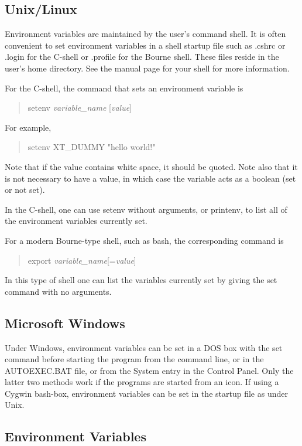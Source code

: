 \begin{itemize}
\subsection{Unix/Linux}

Environment variables are maintained by the user's command shell.  It
is often convenient to set environment variables in a shell startup
file such as {\vt .cshrc} or {\vt .login} for the C-shell or {\vt
.profile} for the Bourne shell.  These files reside in the user's home
directory.  See the manual page for your shell for more information.

For the C-shell, the command that sets an environment variable is
\begin{quote}
{\vt setenv} {\it variable\_name} [{\it value\/}]
\end{quote}
For example,
\begin{quote}
{\vt setenv XT\_DUMMY "hello world!"}
\end{quote}
Note that if the value contains white space, it should be quoted. 
Note also that it is not necessary to have a value, in which case the
variable acts as a boolean (set or not set).

In the C-shell, one can use {\vt setenv} without arguments, or {\vt
printenv}, to list all of the environment variables currently set.

For a modern Bourne-type shell, such as {\vt bash}, the corresponding
command is
\begin{quote}
{\vt export} {\it variable\_name\/}[={\it value\/}]
\end{quote}
In this type of shell one can list the variables currently set by
giving the {\vt set} command with no arguments.

\subsection{Microsoft Windows}

Under Windows, environment variables can be set in a DOS box with the
{\vt set} command before starting the program from the command line,
or in the {\vt AUTOEXEC.BAT} file, or from the {\cb System} entry in
the {\cb Control Panel}.  Only the latter two methods work if the
programs are started from an icon.  If using a Cygwin bash-box,
environment variables can be set in the startup file as under Unix.

\subsection{{\XicTools} Environment Variables}


\end{itemize}
